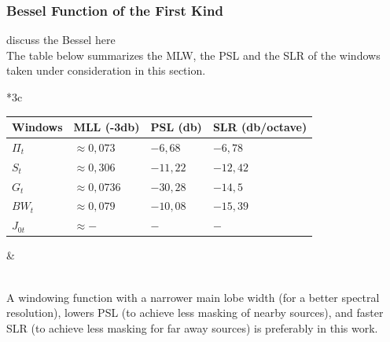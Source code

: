 \documentclass[useAMS,usenatbib]{mn2e}
\begin{document}
\subsubsection{Bessel Function of the First Kind}
discuss the Bessel here\\
 The table below summarizes the MLW, the PSL and the SLR of the windows taken under consideration in this section.
\begin{tabular}{*3{c}}
 \\
 \begin{tabular}{|l|l|l|l|}
  \footnotesize Windows &\textbf{\footnotesize MLL (-3db)}&\textbf{\footnotesize PSL (db)} &\textbf{\footnotesize SLR (db/octave) }  \\
  \hline\hline
  {\footnotesize $\Pi_t$} &{\footnotesize $\approx 0,073$} &{\footnotesize $-6,68$}&{\footnotesize $-6,78$}\\
  {\footnotesize $S_t$} &{\footnotesize  $\approx0,306$}&{\footnotesize  $-11,22$}&{\footnotesize  $-12,42$} \\
  {\footnotesize $G_{t}$} & {\footnotesize $\approx0,0736$}&{\footnotesize  $-30,28$}&{\footnotesize  $-14,5$}\\ 
  {\footnotesize $BW_{t}$} &{\footnotesize  $\approx0,079$} &{\footnotesize $-10,08$ }&{\footnotesize  $-15,39$}\\
  {\footnotesize $J_{0t}$} &{\footnotesize  $\approx- $} &{\footnotesize $ -$ }&{\footnotesize  $ -$}
  \end{tabular}& \label{BDWBnoise}
\end{tabular}\\
A windowing function with a narrower main lobe width (for a better spectral resolution), lowers PSL (to achieve less
masking of nearby sources), and faster SLR (to achieve less masking for far away sources) is preferably in this work.
\end{document}
